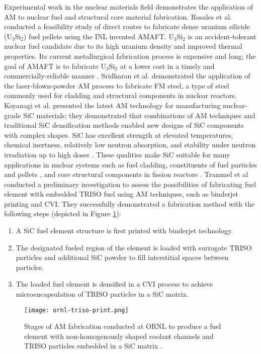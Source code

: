 Experimental work in the nuclear materials field demonstrates the application 
of \gls{AM} to nuclear fuel and structural core material fabrication. 
Rosales et al. \cite{rosales_characterizing_2019} conducted a feasibility study 
of direct routes to fabricate dense uranium silicide (U$_3$Si$_2$) fuel pellets 
using the \gls{INL} invented \gls{AMAFT}. 
U$_3$Si$_2$ is an accident-tolerant nuclear fuel candidate due to its
high uranium density and improved thermal properties. 
Its current metallurgical fabrication process is expensive and long; the goal of
\gls{AMAFT} is to fabricate U$_3$Si$_2$ at a lower cost in a timely and
commercially-reliable manner \cite{rosales_characterizing_2019}.  
Sridharan et al. \cite{sridharan_performance_2019} demonstrated the application of
the laser-blown-powder \gls{AM} process to fabricate \gls{FM} steel, a type of 
steel commonly used for cladding and structural components in nuclear reactors. 
Koyanagi et al. \cite{koyanagi_additive_2020} presented the latest 
\gls{AM} technology for manufacturing nuclear-grade \gls{SiC} materials; they 
demonstrated that combinations of \gls{AM} techniques and traditional \gls{SiC} 
densification methods enabled new designs of \gls{SiC} components with complex shapes. 
\gls{SiC} has excellent strength at elevated temperatures, chemical inertness, 
relatively low neutron absorption, and stability under neutron irradiation up 
to high doses \cite{sauder_ceramic_2014, snead_handbook_2007,koyanagi_additive_2020}. 
These qualities make \gls{SiC} suitable for many applications in nuclear systems 
such as fuel cladding, constituents of fuel particles \cite{snead_handbook_2007} 
and pellets \cite{terrani_progress_2015}, and core structural components in fission 
reactors \cite{sauder_ceramic_2014}. 
Trammel et al \cite{trammell_advanced_2019} conducted a preliminary investigation 
to assess the possibilities of fabricating fuel element with embedded 
\gls{TRISO} fuel using \gls{AM} techniques, such as binderjet printing and \gls{CVI}. 
They successfully demonstrated a fabrication method with the following steps 
(depicted in Figure \ref{fig:ornl-triso-print}): 
\begin{enumerate}
    \item A SiC fuel element structure is first printed with binderjet technology. 
    \item The designated fueled region of the element is loaded with surrogate 
    \gls{TRISO} particles and additional SiC powder to fill interstitial spaces
    between particles. 
    \item The loaded fuel element is densified in a \gls{CVI} process to achieve 
    microencapsulation of \gls{TRISO} particles in a SiC matrix. 
\end{enumerate}
\begin{figure}[]
    \centering
    \texttt{[image: ornl-triso-print.png]} 
    \caption{Stages of \gls{AM} fabrication conducted at \acrlong{ORNL} to 
    produce a fuel element with non-homogenously shaped coolant channels and
    \gls{TRISO} particles embedded in a SiC matrix \cite{trammell_advanced_2019}.}
    \label{fig:ornl-triso-print}
\end{figure}

